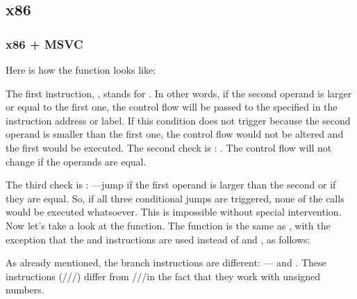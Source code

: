 \subsection{x86}

\subsubsection{x86 + MSVC}

Here is how the  function looks like:




The first instruction, \JLE, stands for . 
In other words, if the second operand is 
larger or equal to the first one, the control flow will be passed to the specified in the instruction address or label.
If this condition does not trigger because the second operand is smaller than the first one, the control flow would not be altered and the first \printf would be executed.
The second check is \JNE: .
The control flow will not change if the operands are equal.

The third check is \JGE: ---jump if the first operand is larger than 
the second or if they are equal.
So, if all three conditional jumps are triggered, none of the \printf calls would be executed whatsoever. 
This is impossible without special intervention.
Now let's take a look at the  function.
The  function is the same as , with the exception that the \JBE and \JAE instructions
are used instead of \JLE and \JGE, as follows:




As already mentioned, the branch instructions are different:
\JBE--- and \JAE\EMDASH{}.
These instructions (\JA/\JAE/\JB/\JBE) differ from \JG/\JGE/\JL/\JLE in the fact that they work with unsigned numbers.


